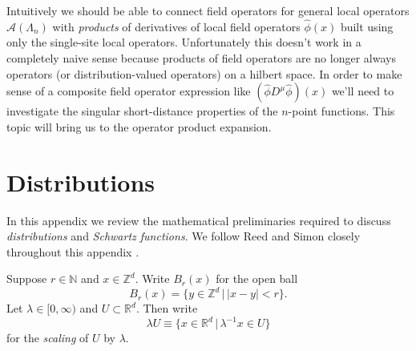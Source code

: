 \documentclass[prl,twocolumn,lengthcheck,superscriptaddress]{revtex4-1}
\theoremstyle{definition}
\theoremstyle{remark}
\begin{document}
Intuitively we should be able to connect field operators for general local operators $\mathcal{A}(\Lambda_n)$ with \emph{products} of derivatives of local field operators $\widehat{\phi}(x)$ built using only the single-site local operators. Unfortunately this doesn't work in a completely naive sense because products of field operators are no longer always operators (or distribution-valued operators) on a hilbert space. In order to make sense of a composite field operator expression like $(\widehat{\phi} D^\mu\widehat{\phi})(x)$ we'll need to investigate the singular short-distance properties of the $n$-point functions. This topic will bring us to the operator product expansion.

\section{Distributions}
In this appendix we review the mathematical preliminaries required to discuss \emph{distributions} and \emph{Schwartz functions}. We follow Reed and Simon closely throughout this appendix \cite{reed:1978a}.

Suppose $r \in \mathbb{N}$ and $x\in \mathbb{Z}^d$. Write $B_r(x)$ for the open ball
\begin{equation}
	B_r(x) = \{y\in \mathbb{Z}^d\,|\, |x-y| < r\}.
\end{equation}
Let $\lambda \in [0, \infty)$ and $U\subset \mathbb{R}^d$. Then write 
\begin{equation}
	\lambda U \equiv \{x\in \mathbb{R}^d\,|\, \lambda^{-1} x \in U\}
\end{equation}
for the \emph{scaling} of $U$ by $\lambda$.
 
\end{document}
